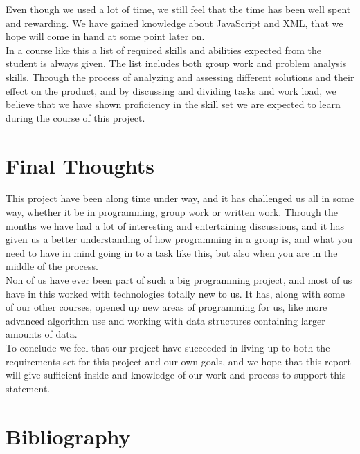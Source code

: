 \documentclass[a4paper,10pt,titlepage]{article}
\begin{document}
Even though we used a lot of time, we still feel that the time has been well spent and rewarding. We have gained knowledge about JavaScript and XML, that we hope will come in hand at some point later on.\\

In a course like this a list of required skills and abilities expected from the student is always given. The list includes both group work and problem analysis skills. Through the process of analyzing and assessing different solutions and their effect on the product, and by discussing and dividing tasks and work load, we believe that we have shown proficiency in the skill set we are expected to learn during the course of this project.

	 
	\newpage
	
	\section{Final Thoughts}
	This project have been along time under way, and it has challenged us all in some way, whether it be in programming, group work or written work. Through the months we have had a lot of interesting and entertaining discussions, and it has given us a better understanding of how programming in a group is, and what you need to have in mind going in to a task like this, but also when you are in the middle of the process.\\

Non of us have ever been part of such a big programming project, and most of us have in this worked with technologies totally new to us. It has, along with some of our other courses, opened up new areas of programming for us, like more advanced algorithm use and working with data structures containing larger amounts of data.\\

To conclude we feel that our project have succeeded in living up to both the requirements set for this project and our own goals, and we hope that this report will give sufficient inside and knowledge of our work and process to support this statement.\\
	
	\newpage	
	
	\section{Bibliography}
	
\end{document}
